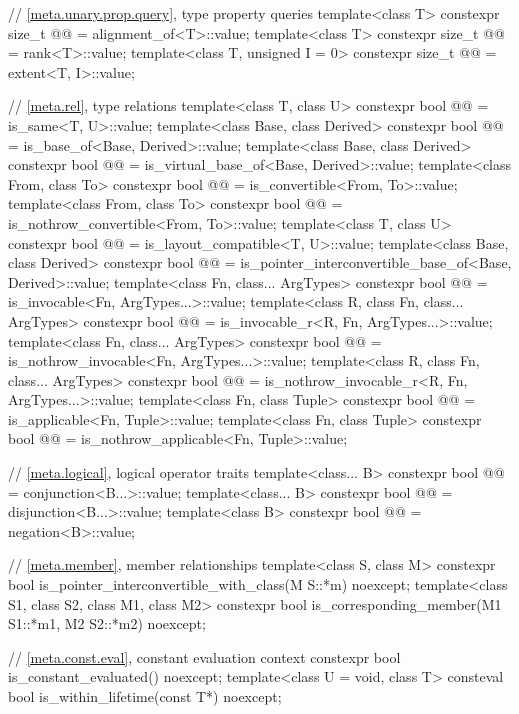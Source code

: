 \begin{codeblock}
{  // \ref{meta.unary.prop.query}, type property queries
  template<class T>
    constexpr size_t @@ = alignment_of<T>::value;
  template<class T>
    constexpr size_t @@ = rank<T>::value;
  template<class T, unsigned I = 0>
    constexpr size_t @@ = extent<T, I>::value;

  // \ref{meta.rel}, type relations
  template<class T, class U>
    constexpr bool @@ = is_same<T, U>::value;
  template<class Base, class Derived>
    constexpr bool @@ = is_base_of<Base, Derived>::value;
  template<class Base, class Derived>
    constexpr bool @@ = is_virtual_base_of<Base, Derived>::value;
  template<class From, class To>
    constexpr bool @@ = is_convertible<From, To>::value;
  template<class From, class To>
    constexpr bool @@ = is_nothrow_convertible<From, To>::value;
  template<class T, class U>
    constexpr bool @@ = is_layout_compatible<T, U>::value;
  template<class Base, class Derived>
    constexpr bool @@
      = is_pointer_interconvertible_base_of<Base, Derived>::value;
  template<class Fn, class... ArgTypes>
    constexpr bool @@ = is_invocable<Fn, ArgTypes...>::value;
  template<class R, class Fn, class... ArgTypes>
    constexpr bool @@ = is_invocable_r<R, Fn, ArgTypes...>::value;
  template<class Fn, class... ArgTypes>
    constexpr bool @@ = is_nothrow_invocable<Fn, ArgTypes...>::value;
  template<class R, class Fn, class... ArgTypes>
    constexpr bool @@ = is_nothrow_invocable_r<R, Fn, ArgTypes...>::value;
  template<class Fn, class Tuple>
    constexpr bool @@ = is_applicable<Fn, Tuple>::value;
  template<class Fn, class Tuple>
    constexpr bool @@ = is_nothrow_applicable<Fn, Tuple>::value;

  // \ref{meta.logical}, logical operator traits
  template<class... B>
    constexpr bool @@ = conjunction<B...>::value;
  template<class... B>
    constexpr bool @@ = disjunction<B...>::value;
  template<class B>
    constexpr bool @@ = negation<B>::value;

  // \ref{meta.member}, member relationships
  template<class S, class M>
    constexpr bool is_pointer_interconvertible_with_class(M S::*m) noexcept;
  template<class S1, class S2, class M1, class M2>
    constexpr bool is_corresponding_member(M1 S1::*m1, M2 S2::*m2) noexcept;

  // \ref{meta.const.eval}, constant evaluation context
  constexpr bool is_constant_evaluated() noexcept;
  template<class U = void, class T>
    consteval bool is_within_lifetime(const T*) noexcept;
}
\end{codeblock}

